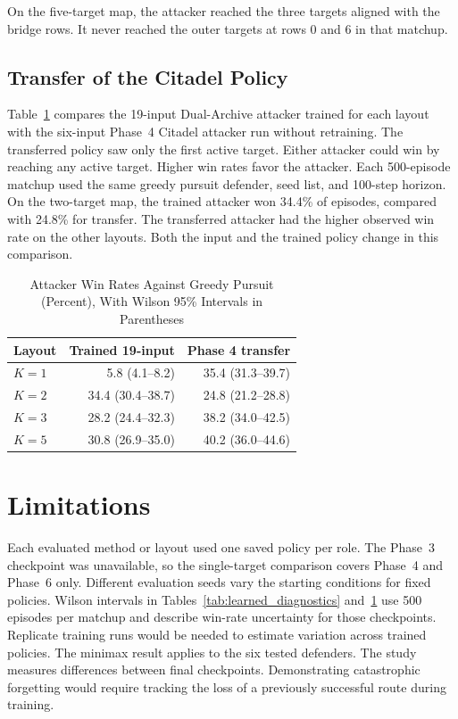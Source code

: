 \documentclass[conference,a4paper]{IEEEtran}
\begin{document}
On the five-target map, the attacker reached the three targets aligned with the bridge rows. It never reached the outer targets at rows 0 and 6 in that matchup.

\subsection{Transfer of the Citadel Policy}
Table~\ref{tab:transfer} compares the 19-input Dual-Archive attacker trained for each layout with the six-input Phase~4 Citadel attacker run without retraining. The transferred policy saw only the first active target. Either attacker could win by reaching any active target. Higher win rates favor the attacker. Each 500-episode matchup used the same greedy pursuit defender, seed list, and 100-step horizon. On the two-target map, the trained attacker won 34.4\% of episodes, compared with 24.8\% for transfer. The transferred attacker had the higher observed win rate on the other layouts. Both the input and the trained policy change in this comparison.
\begin{table}[t]
\caption{Attacker Win Rates Against Greedy Pursuit (Percent), With Wilson 95\% Intervals in Parentheses}
\label{tab:transfer}
\centering
\begin{tabular}{@{}lrr@{}}
\toprule
Layout & Trained 19-input & Phase 4 transfer \\
\midrule
$K=1$ & 5.8 (4.1--8.2) & 35.4 (31.3--39.7) \\
$K=2$ & 34.4 (30.4--38.7) & 24.8 (21.2--28.8) \\
$K=3$ & 28.2 (24.4--32.3) & 38.2 (34.0--42.5) \\
$K=5$ & 30.8 (26.9--35.0) & 40.2 (36.0--44.6) \\
\bottomrule
\end{tabular}
\end{table}

\section{Limitations}
Each evaluated method or layout used one saved policy per role. The Phase~3 checkpoint was unavailable, so the single-target comparison covers Phase~4 and Phase~6 only. Different evaluation seeds vary the starting conditions for fixed policies. Wilson intervals in Tables~\ref{tab:learned_diagnostics} and~\ref{tab:transfer} use 500 episodes per matchup and describe win-rate uncertainty for those checkpoints. Replicate training runs would be needed to estimate variation across trained policies. The minimax result applies to the six tested defenders. The study measures differences between final checkpoints. Demonstrating catastrophic forgetting would require tracking the loss of a previously successful route during training.
\end{document}
